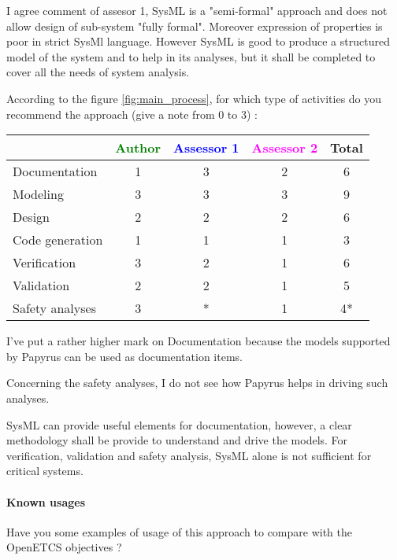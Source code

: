 \begin{assessor2}
I agree comment of assesor 1, SysML is a "semi-formal" approach and does not allow design of sub-system "fully formal". Moreover expression of properties is poor in strict SysMl language.
However SysML is good to produce a structured model of the system  and to help  in its analyses, but it shall be completed to cover all the needs of system analysis.
\end{assessor2}

According to the figure \ref{fig:main_process}, for which type of activities do you recommend the approach (give a note from 0 to 3) :

\begin{tabular}{|l | c | c | c | c|}
\hline
& \textcolor{green}{Author} & \textcolor{blue}{Assessor 1} & \textcolor{magenta}{Assessor 2} & Total \\
\hline
Documentation & 1 & 3 & 2 & 6 \\
\hline
Modeling & 3 &  3 & 3 & 9 \\
\hline
Design & 2 &  2 & 2 & 6 \\
\hline
Code generation & 1 &  1 & 1 & 3 \\
\hline
Verification & 3 &  2 & 1 & 6 \\
\hline
Validation & 2 &  2 & 1 & 5 \\
\hline
Safety analyses & 3 & * & 1 & 4* \\
\hline
\end{tabular}

\begin{assessor1}
I've put a rather higher mark on Documentation because the models supported by Papyrus can be used as documentation items. 

Concerning the safety analyses, I do not see how Papyrus helps in driving such analyses. 
\end{assessor1}

\begin{assessor2}
SysML can provide useful elements for documentation, however, a clear methodology shall be provide to understand and drive the models. For verification, validation and safety analysis, SysML alone is not sufficient for critical systems. 
\end{assessor2}

\paragraph{Known usages} Have you some examples of usage of this approach to compare with the OpenETCS objectives ?

